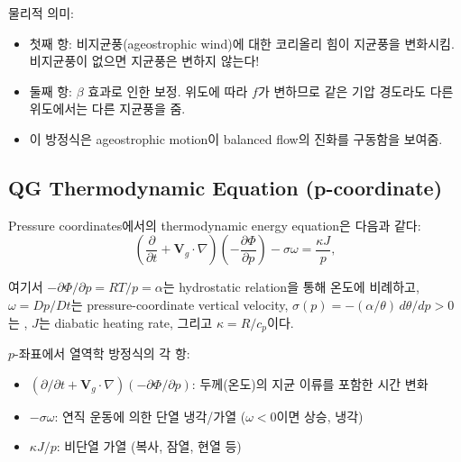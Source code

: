 \begin{hisublock}
물리적 의미:
\begin{itemize}
  \item 첫째 항: 비지균풍(ageostrophic wind)에 대한 코리올리 힘이 지균풍을 변화시킴.
        비지균풍이 없으면 지균풍은 변하지 않는다!
  \item 둘째 항: $\beta$ 효과로 인한 보정.  위도에 따라 $f$가 변하므로
        같은 기압 경도라도 다른 위도에서는 다른 지균풍을 줌.
  \item 이 방정식은 ageostrophic motion이 balanced flow의 진화를 구동함을 보여줌.
\end{itemize}
\end{hisublock}

\subsection{QG Thermodynamic Equation (p-coordinate)}\label{subsec:qg-thermo-p}

Pressure coordinates에서의 thermodynamic energy equation은 다음과 같다:
\begin{equation}\label{eq:qg-thermo-p}
  \boxed{
  \left(\frac{\partial}{\partial t}
    + \mathbf{V}_g\cdot\nabla\right)
  \!\left(-\frac{\partial\Phi}{\partial p}\right)
  - \sigma\omega = \frac{\kappa J}{p},
  }
\end{equation}

\noindent
여기서 $-\partial\Phi/\partial p = RT/p = \alpha$는 hydrostatic relation을 통해
온도에 비례하고, $\omega = Dp/Dt$는 pressure-coordinate vertical velocity,
$\sigma(p) = -(\alpha/\theta)\,d\theta/dp > 0$는 , $J$는 diabatic heating rate, 그리고
$\kappa = R/c_p$이다.

\begin{hisublock}
$p$-좌표에서 열역학 방정식의 각 항:
\begin{itemize}
  \item $(\partial/\partial t + \mathbf{V}_g\cdot\nabla)(-\partial\Phi/\partial p)$:
        두께(온도)의 지균 이류를 포함한 시간 변화
  \item $-\sigma\omega$: 연직 운동에 의한 단열 냉각/가열 ($\omega < 0$이면 상승, 냉각)
  \item $\kappa J/p$: 비단열 가열 (복사, 잠열, 현열 등)
\end{itemize}
\end{hisublock}

